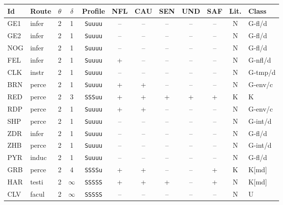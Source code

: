 {\scriptsize\setlength{\tabcolsep}{3pt}
\begin{longtable}{@{}llcccccccccl@{}}
\toprule
Id & Route & $\theta$ & $\delta$ & Profile & NFL & CAU & SEN & UND & SAF & Lit. & Class \\
\midrule\endhead
\bottomrule\endfoot
GE1 & infer & 2 & 1 & \texttt{Suuuu} & \textsf{--} & \textsf{--} & \textsf{--} & \textsf{--} & \textsf{--} & N & G-fl/d \\
GE2 & infer & 2 & 1 & \texttt{Suuuu} & \textsf{--} & \textsf{--} & \textsf{--} & \textsf{--} & \textsf{--} & N & G-fl/d \\
NOG & infer & 2 & 1 & \texttt{Suuuu} & \textsf{--} & \textsf{--} & \textsf{--} & \textsf{--} & \textsf{--} & N & G-fl/d \\
FEL & infer & 2 & 1 & \texttt{Suuuu} & \textsf{+} & \textsf{--} & \textsf{--} & \textsf{--} & \textsf{--} & N & G-nfl/d \\
CLK & instr & 2 & 1 & \texttt{Suuuu} & \textsf{--} & \textsf{--} & \textsf{--} & \textsf{--} & \textsf{--} & N & G-tmp/d \\
BRN & perce & 2 & 1 & \texttt{Suuuu} & \textsf{+} & \textsf{+} & \textsf{--} & \textsf{--} & \textsf{--} & N & G-env/c \\
RED & perce & 2 & 3 & \texttt{SSSuu} & \textsf{+} & \textsf{+} & \textsf{+} & \textsf{+} & \textsf{+} & K & K \\
RDP & perce & 2 & 1 & \texttt{Suuuu} & \textsf{+} & \textsf{+} & \textsf{--} & \textsf{--} & \textsf{--} & N & G-env/c \\
SHP & perce & 2 & 1 & \texttt{Suuuu} & \textsf{--} & \textsf{--} & \textsf{--} & \textsf{--} & \textsf{--} & N & G-int/d \\
ZDR & infer & 2 & 1 & \texttt{Suuuu} & \textsf{--} & \textsf{--} & \textsf{--} & \textsf{--} & \textsf{--} & N & G-fl/d \\
ZHB & perce & 2 & 1 & \texttt{Suuuu} & \textsf{--} & \textsf{--} & \textsf{--} & \textsf{--} & \textsf{--} & N & G-int/d \\
PYR & induc & 2 & 1 & \texttt{Suuuu} & \textsf{--} & \textsf{--} & \textsf{--} & \textsf{--} & \textsf{--} & N & G-fl/d \\
GRB & perce & 2 & 4 & \texttt{SSSSu} & \textsf{+} & \textsf{+} & \textsf{--} & \textsf{--} & \textsf{+} & K & K[md] \\
HAR & testi & 2 & $\infty$ & \texttt{SSSSS} & \textsf{+} & \textsf{+} & \textsf{+} & \textsf{--} & \textsf{+} & N & K[md] \\
CLV & facul & 2 & $\infty$ & \texttt{SSSSS} & \textsf{--} & \textsf{--} & \textsf{--} & \textsf{--} & \textsf{--} & N & U \\

\end{longtable}}
